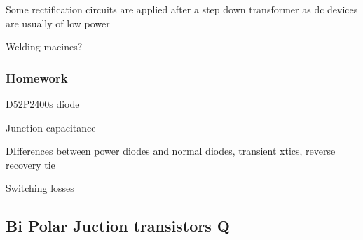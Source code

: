 \documentclass{article}
\begin{document}
    Some rectification circuits are applied after a step down transformer as dc devices are usually of low power

    Welding macines?
    \subsubsection*{Homework}
    D52P2400s diode 

    Junction capacitance 

    DIfferences between power diodes and normal diodes, transient xtics, reverse recovery tie
     
    Switching losses

    \subsection{Bi Polar Juction transistors Q}
\end{document}
